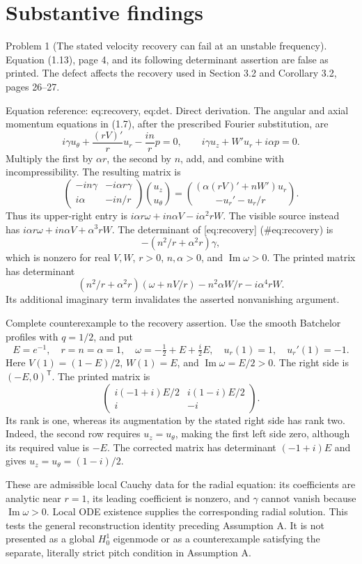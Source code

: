 \documentclass[10pt]{article}
\begin{document}
\section*{Substantive findings}
Problem 1 (The stated velocity recovery can fail at an unstable frequency).  Equation (1.13), page 4, and its following determinant assertion are false as printed. The defect affects the recovery used in Section 3.2 and Corollary 3.2, pages 26–27.\par
Equation reference: eq:recovery, eq:det. Direct derivation. The angular and axial momentum equations in (1.7), after the prescribed Fourier substitution, are \[i\gamma u_\theta+\frac{(rV)'}r u_r-\frac{in}r p=0,\qquad
 i\gamma u_z+W'u_r+i\alpha p=0.\] Multiply the first by \(\alpha r\), the second by \(n\), add, and combine with incompressibility. The resulting matrix is \[\begin{pmatrix}
 -in\gamma&-i\alpha r\gamma\\ i\alpha&-in/r
 \end{pmatrix}
 \binom{u_z}{u_\theta}
 =
 \binom{(\alpha(rV)'+nW')u_r}{-u_r'-u_r/r}.
 \] Thus its upper-right entry is \(i\alpha r\omega+in\alpha V-i\alpha^2rW\). The visible source instead has \(i\alpha r\omega+in\alpha V+\alpha^3rW\). The determinant of [eq:recovery] (\#eq:recovery) is \[-\left(n^2/r+\alpha^2r\right)\gamma,
 \] which is nonzero for real \(V,W\), \(r>0\), \(n,\alpha>0\), and \(\operatorname{Im}\omega>0\). The printed matrix has determinant \[(n^2/r+\alpha^2r)(\omega+nV/r)-n^2\alpha W/r-i\alpha^4rW.\] Its additional imaginary term invalidates the asserted nonvanishing argument.\par
Complete counterexample to the recovery assertion. Use the smooth Batchelor profiles with \(q=1/2\), and put \[E=e^{-1},\quad r=n=\alpha=1,\quad
 \omega=-\tfrac12+E+\tfrac i2 E,\quad
 u_r(1)=1,\quad u_r'(1)=-1.\] Here \(V(1)=(1-E)/2\), \(W(1)=E\), and \(\operatorname{Im}\omega=E/2>0\). The right side is \((-E,0)^{\mathsf T}\). The printed matrix is \[\begin{pmatrix}
 i(-1+i)E/2&i(1-i)E/2\\ i&-i
 \end{pmatrix}.\] Its rank is one, whereas its augmentation by the stated right side has rank two. Indeed, the second row requires \(u_z=u_\theta\), making the first left side zero, although its required value is \(-E\). The corrected matrix has determinant \((-1+i)E\) and gives \(u_z=u_\theta=(1-i)/2\).\par
These are admissible local Cauchy data for the radial equation: its coefficients are analytic near \(r=1\), its leading coefficient is nonzero, and \(\gamma\) cannot vanish because \(\operatorname{Im}\omega>0\). Local ODE existence supplies the corresponding radial solution. This tests the general reconstruction identity preceding Assumption A. It is not presented as a global \(H^1_0\) eigenmode or as a counterexample satisfying the separate, literally strict pitch condition in Assumption A.\par
\end{document}
